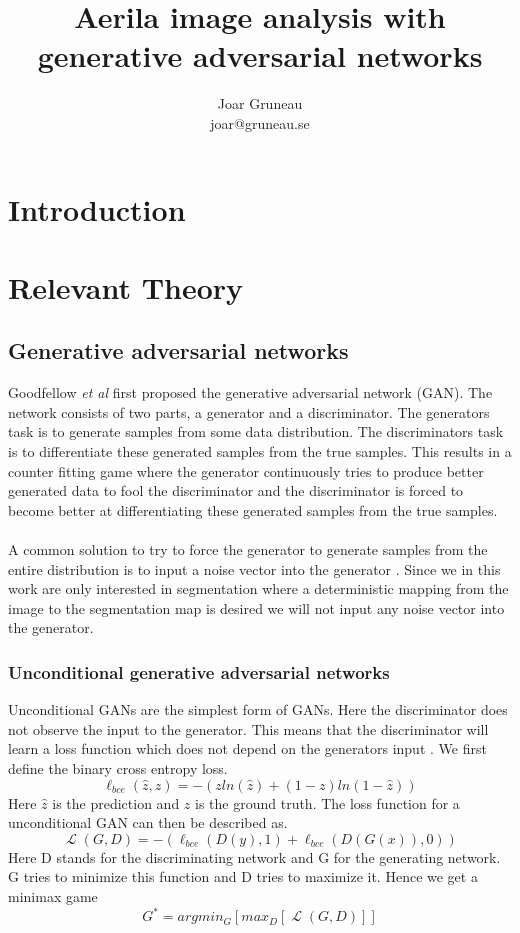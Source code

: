 \documentclass[a4paper,11pt]{article}
\title{Aerila image analysis with generative adversarial networks}
\author{Joar Gruneau \\ joar@gruneau.se}
\affil{}
\DeclareMathOperator{\Lagr}{\mathcal{L}}
\begin{document}
\maketitle
\newpage
\section{Introduction}
\section{Relevant Theory}
\subsection{Generative adversarial networks}
Goodfellow \textit{et al} \cite{goodfellow_nips_2016} first proposed the generative adversarial network (GAN). The network consists of two parts, a generator and a discriminator. The generators task is to generate samples from some data distribution. The discriminators task is to differentiate these generated samples from the true samples. This results in a counter fitting game where the generator continuously tries to produce better generated data to fool the discriminator and the discriminator is forced to become better at differentiating these generated samples from the true samples.\\
\\
A common solution to try to force the generator to generate samples from the entire distribution is to input a noise vector into the generator \cite{reed_generative_2016}. Since we in this work are only interested in segmentation where a deterministic mapping from the image to the segmentation map is desired we will not input any  noise vector into the generator.

\subsubsection{Unconditional generative adversarial networks}
Unconditional GANs are the simplest form of GANs. Here the discriminator does not observe the input to the generator. This means that the discriminator will learn a loss function which does not depend on the generators input \cite{isola_image--image_2016}. We first define the binary cross entropy loss.
\begin{equation}\label{eq:bce}
\ell_{bce}(\hat{z}, z)=-(zln(\hat{z})+(1-z)ln(1-\hat{z}))
\end{equation}
Here $\hat{z}$ is the prediction and $z$ is the ground truth.
The loss function for a unconditional GAN can then be described as.
 \begin{equation}
\Lagr(G, D) = -(\ell_{bce}(D(y), 1) + \ell_{bce}(D(G(x)), 0))
\end{equation}
Here D stands for the discriminating network and G for the generating network. G tries to minimize this function and D tries to maximize it. Hence we get a minimax game 
\begin{equation}
G^{*}=argmin_{G}[max_{D}[\Lagr(G, D)]]\label{eq:minimax}
\end{equation}
\end{document}

